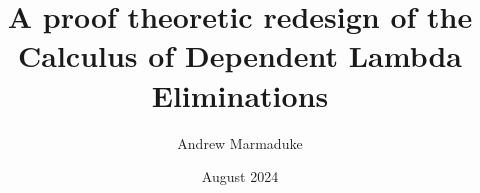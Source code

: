 \documentclass[letterpaper, 11pt]{uiowa-thesis}
\title{A proof theoretic redesign of the Calculus of Dependent Lambda Eliminations}
\author{Andrew Marmaduke}
\date{August 2024}
\begin{document}

\titlepage

\copyrightPage

\frontmatter








\tableofcontents

\setlength{\cftparskip}{\baselineskip}
\listoffigures

%

\mainmatter








%
%
%

\backmatter

\printbibliography
\end{document}
